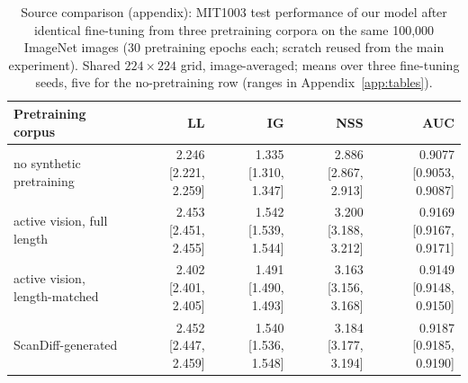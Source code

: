 \begin{table}[t]
  \centering
  \small
  \begin{tabular}{lrrrr}
    \toprule
    Pretraining corpus & LL & IG & NSS & AUC \\
    \midrule
    no synthetic pretraining & 2.246 \scriptsize[2.221, 2.259] & 1.335 \scriptsize[1.310, 1.347] & 2.886 \scriptsize[2.867, 2.913] & 0.9077 \scriptsize[0.9053, 0.9087] \\
    active vision, full length & 2.453 \scriptsize[2.451, 2.455] & 1.542 \scriptsize[1.539, 1.544] & 3.200 \scriptsize[3.188, 3.212] & 0.9169 \scriptsize[0.9167, 0.9171] \\
    active vision, length-matched & 2.402 \scriptsize[2.401, 2.405] & 1.491 \scriptsize[1.490, 1.493] & 3.163 \scriptsize[3.156, 3.168] & 0.9149 \scriptsize[0.9148, 0.9150] \\
    ScanDiff-generated & 2.452 \scriptsize[2.447, 2.459] & 1.540 \scriptsize[1.536, 1.548] & 3.184 \scriptsize[3.177, 3.194] & 0.9187 \scriptsize[0.9185, 0.9190] \\
    \bottomrule
  \end{tabular}
  \caption{Source comparison (appendix): MIT1003 test performance of our model after identical fine-tuning from three pretraining corpora on the same 100,000 ImageNet images (30 pretraining epochs each; scratch reused from the main experiment). Shared $224\times224$ grid, image-averaged; means over three fine-tuning seeds, five for the no-pretraining row (ranges in Appendix~\ref{app:tables}).}
  \label{tab:triangle}
\end{table}
